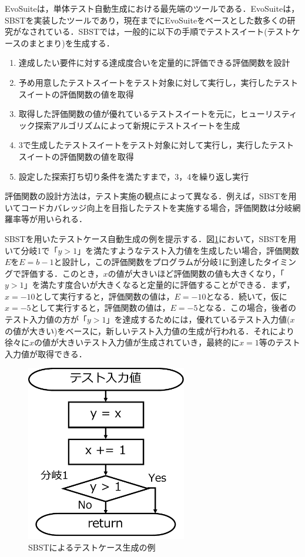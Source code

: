 \documentclass[12pt]{jarticle} %
\begin{document}
{\sf EvoSuite}\cite{EvoSuite}は，単体テスト自動生成における最先端のツールである．{\sf EvoSuite}は，SBSTを実装したツールであり，現在までに{\sf EvoSuite}をベースとした数多くの研究がなされている．SBSTでは，一般的に以下の手順でテストスイート(テストケースのまとまり)を生成する．

\begin{enumerate}
\item 達成したい要件に対する達成度合いを定量的に評価できる評価関数を設計
\item 予め用意したテストスイートをテスト対象に対して実行し，実行したテストスイートの評価関数の値を取得
\item 取得した評価関数の値が優れているテストスイートを元に，ヒューリスティック探索アルゴリズムによって新規にテストスイートを生成
\item 3で生成したテストスイートをテスト対象に対して実行し，実行したテストスイートの評価関数の値を取得
\item 設定した探索打ち切り条件を満たすまで，3，4を繰り返し実行
\end{enumerate}

評価関数の設計方法は，テスト実施の観点によって異なる．例えば，SBSTを用いてコードカバレッジ向上を目指したテストを実施する場合，評価関数は分岐網羅率等が用いられる．

SBSTを用いたテストケース自動生成の例を提示する．図\ref{SBST}において，SBSTを用いて分岐1で「$y > 1$」を満たすようなテスト入力値を生成したい場合，評価関数$E$を$E = b -1$と設計し，この評価関数をプログラムが分岐1に到達したタイミングで評価する．このとき，$x$の値が大きいほど評価関数の値も大きくなり，「$y > 1$」を満たす度合いが大きくなると定量的に評価することができる．まず，$x = -10$として実行すると，評価関数の値は，$E = -10$となる．続いて，仮に$x = -5$として実行すると，評価関数の値は，$E = -5$となる．この場合，後者のテスト入力値の方が「$y > 1$」を達成するためには，優れているテスト入力値($x$の値が大きい)をベースに，新しいテスト入力値の生成が行われる．それにより徐々に$x$の値が大きいテスト入力値が生成されていき，最終的に$x = 1$等のテスト入力値が取得できる．

\begin{figure}[htbp]
\begin{center}
\includegraphics[clip,width=7cm]{image/SBST.pdf}
\caption{SBSTによるテストケース生成の例}
\label{SBST}
\end{center}
\end{figure}
\end{document}
